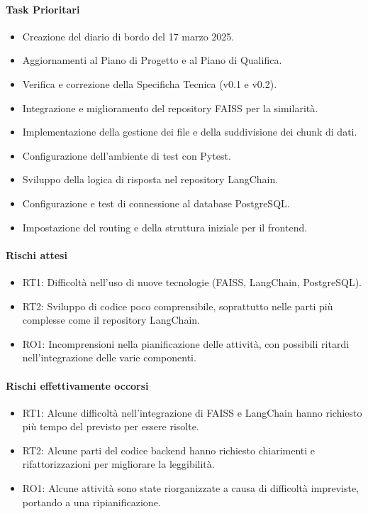 \documentclass{article}
\begin{document}
            \paragraph{Task Prioritari}
            \begin{itemize}
                \item Creazione del diario di bordo del 17 marzo 2025.
                \item Aggiornamenti al Piano di Progetto e al Piano di Qualifica.
                \item Verifica e correzione della Specificha Tecnica (v0.1 e v0.2).
                \item Integrazione e miglioramento del repository FAISS per la similarità.
                \item Implementazione della gestione dei file e della suddivisione dei chunk di dati.
                \item Configurazione dell’ambiente di test con Pytest.
                \item Sviluppo della logica di risposta nel repository LangChain.
                \item Configurazione e test di connessione al database PostgreSQL.
                \item Impostazione del routing e della struttura iniziale per il frontend.
            \end{itemize}
            
            \paragraph{Rischi attesi}
            \begin{itemize}
                \item RT1: Difficoltà nell’uso di nuove tecnologie (FAISS, LangChain, PostgreSQL).
                \item RT2: Sviluppo di codice poco comprensibile, soprattutto nelle parti più complesse come il repository LangChain.
                \item RO1: Incomprensioni nella pianificazione delle attività, con possibili ritardi nell’integrazione delle varie componenti.
            \end{itemize}
            
            \paragraph{Rischi effettivamente occorsi}
            \begin{itemize}
                \item RT1: Alcune difficoltà nell’integrazione di FAISS e LangChain hanno richiesto più tempo del previsto per essere risolte.
                \item RT2: Alcune parti del codice backend hanno richiesto chiarimenti e rifattorizzazioni per migliorare la leggibilità.
                \item RO1: Alcune attività sono state riorganizzate a causa di difficoltà impreviste, portando a una ripianificazione.
            \end{itemize}
            
\end{document}
